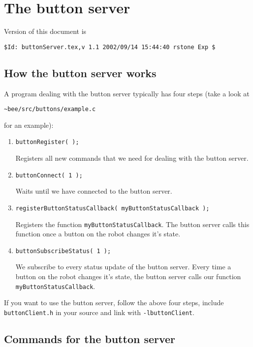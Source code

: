 \documentclass{article}
\begin{document}
\section{The button server}

Version of this document is
\begin{verbatim}
$Id: buttonServer.tex,v 1.1 2002/09/14 15:44:40 rstone Exp $
\end{verbatim}
 
\subsection{How the button server works} 
 
A program dealing with the button server typically has four steps (take a look at
\begin{center} 
  \texttt{\~{}bee/src/buttons/example.c}
\end{center}
for an example):

\begin{enumerate}
  
\item \texttt{buttonRegister( );} 
  
  Registers all new commands that we need for dealing with the button server.
  
\item \texttt{buttonConnect( 1 );} 
  
  Waits until we have connected to the button server.
  
\item \texttt{registerButtonStatusCallback( myButtonStatusCallback );} 
  
  Registers the function \texttt{myButtonStatusCallback}. The button server
  calls this function once a button on the robot changes it's state.

\item \texttt{buttonSubscribeStatus( 1 );}
  
  We subscribe to every status update of the button server. Every time a
  button on the robot changes it's state, the button server calls our function
  \texttt{myButtonStatusCallback}.

\end{enumerate}
 
If you want to use the button server, follow the above four steps, include
\texttt{buttonClient.h} in your source and link with \texttt{-lbuttonClient}.

\subsection{Commands for the button server}
\end{document}
